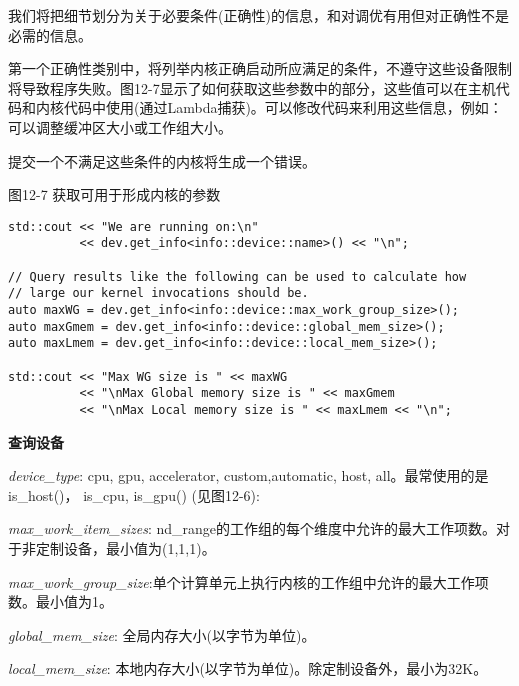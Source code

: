 我们将把细节划分为关于必要条件(正确性)的信息，和对调优有用但对正确性不是必需的信息。\par

第一个正确性类别中，将列举内核正确启动所应满足的条件，不遵守这些设备限制将导致程序失败。图12-7显示了如何获取这些参数中的部分，这些值可以在主机代码和内核代码中使用(通过Lambda捕获)。可以修改代码来利用这些信息，例如：可以调整缓冲区大小或工作组大小。\par

\begin{tcolorbox}[colback=red!5!white,colframe=red!75!black]
提交一个不满足这些条件的内核将生成一个错误。
\end{tcolorbox}

\hspace*{\fill} \par %
图12-7 获取可用于形成内核的参数
\begin{lstlisting}[caption={}]
std::cout << "We are running on:\n"
		  << dev.get_info<info::device::name>() << "\n";

// Query results like the following can be used to calculate how
// large our kernel invocations should be.
auto maxWG = dev.get_info<info::device::max_work_group_size>();
auto maxGmem = dev.get_info<info::device::global_mem_size>();
auto maxLmem = dev.get_info<info::device::local_mem_size>();

std::cout << "Max WG size is " << maxWG
		  << "\nMax Global memory size is " << maxGmem
		  << "\nMax Local memory size is " << maxLmem << "\n";
\end{lstlisting}

\hspace*{\fill} \par %
\textbf{查询设备}

\textit{device\_type}: cpu, gpu, accelerator, custom,automatic, host, all。最常使用的是is\_host()， is\_cpu, is\_gpu() (见图12-6):\par

\textit{max\_work\_item\_sizes}: nd\_range的工作组的每个维度中允许的最大工作项数。对于非定制设备，最小值为(1,1,1)。\par

\textit{max\_work\_group\_size}:单个计算单元上执行内核的工作组中允许的最大工作项数。最小值为1。\par

\textit{global\_mem\_size}: 全局内存大小(以字节为单位)。\par

\textit{local\_mem\_size}: 本地内存大小(以字节为单位)。除定制设备外，最小为32K。\par

